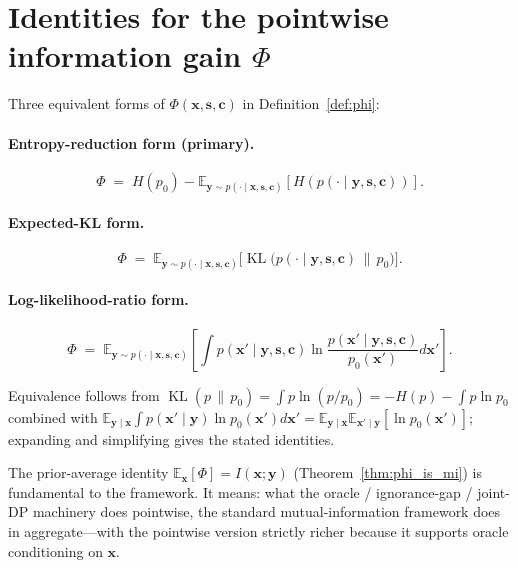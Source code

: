 \documentclass[11pt,a4paper]{article}
\newcommand{\E}{\mathbb{E}}
\newcommand{\KL}{\operatorname{KL}}
\begin{document}
\section{Identities for the pointwise information gain $\Phi$}
\label{app:phi_identities}

Three equivalent forms of $\Phi(\bm{x}, \bm{s}, \bm{c})$ in Definition~\ref{def:phi}:

\paragraph{Entropy-reduction form (primary).}
\begin{equation}
  \Phi \;=\; H(p_0) - \E_{\bm{y} \sim p(\cdot\mid\bm{x},\bm{s},\bm{c})}[H(p(\cdot\mid\bm{y},\bm{s},\bm{c}))].
\end{equation}

\paragraph{Expected-KL form.}
\begin{equation}
  \Phi \;=\; \E_{\bm{y} \sim p(\cdot\mid\bm{x},\bm{s},\bm{c})}\!\bigl[\KL\bigl(p(\cdot\mid\bm{y},\bm{s},\bm{c})\,\big\|\, p_0\bigr)\bigr].
\end{equation}

\paragraph{Log-likelihood-ratio form.}
\begin{equation}
  \Phi \;=\; \E_{\bm{y} \sim p(\cdot\mid\bm{x},\bm{s},\bm{c})}\!\left[ \int p(\bm{x}'\mid\bm{y},\bm{s},\bm{c}) \ln \frac{p(\bm{x}'\mid\bm{y},\bm{s},\bm{c})}{p_0(\bm{x}')} d\bm{x}' \right].
\end{equation}

Equivalence follows from $\KL(p\,\|\,p_0) = \int p \ln(p/p_0) = -H(p) - \int p\ln p_0$ combined with $\E_{\bm{y}\mid\bm{x}} \int p(\bm{x}'\mid\bm{y}) \ln p_0(\bm{x}') d\bm{x}' = \E_{\bm{y}\mid\bm{x}} \E_{\bm{x}'\mid\bm{y}}[\ln p_0(\bm{x}')]$; expanding and simplifying gives the stated identities.

The prior-average identity $\E_{\bm{x}}[\Phi] = I(\bm{x};\bm{y})$ (Theorem~\ref{thm:phi_is_mi}) is fundamental to the framework.  It means: what the oracle / ignorance-gap / joint-DP machinery does pointwise, the standard mutual-information framework does in aggregate---with the pointwise version strictly richer because it supports oracle conditioning on $\bm{x}$.
\end{document}
